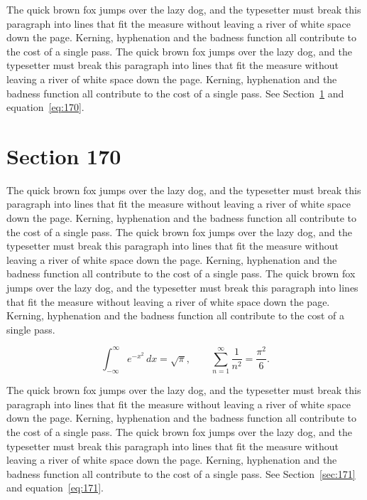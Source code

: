 \documentclass{article}
\begin{document}
The quick brown fox jumps over the lazy dog, and the typesetter must break this paragraph into lines that fit the measure without leaving a river of white space down the page. Kerning, hyphenation and the badness function all contribute to the cost of a single pass. The quick brown fox jumps over the lazy dog, and the typesetter must break this paragraph into lines that fit the measure without leaving a river of white space down the page. Kerning, hyphenation and the badness function all contribute to the cost of a single pass. 
See Section~\ref{sec:170} and equation~\eqref{eq:170}.
\section{Section 170}
\label{sec:170}
The quick brown fox jumps over the lazy dog, and the typesetter must break this paragraph into lines that fit the measure without leaving a river of white space down the page. Kerning, hyphenation and the badness function all contribute to the cost of a single pass. The quick brown fox jumps over the lazy dog, and the typesetter must break this paragraph into lines that fit the measure without leaving a river of white space down the page. Kerning, hyphenation and the badness function all contribute to the cost of a single pass. The quick brown fox jumps over the lazy dog, and the typesetter must break this paragraph into lines that fit the measure without leaving a river of white space down the page. Kerning, hyphenation and the badness function all contribute to the cost of a single pass. 

\begin{equation}\label{eq:170}
\int_{-\infty}^{\infty} e^{-x^{2}}\,dx = \sqrt{\pi}, \qquad
\sum_{n=1}^{\infty} \frac{1}{n^{2}} = \frac{\pi^{2}}{6}.
\end{equation}

The quick brown fox jumps over the lazy dog, and the typesetter must break this paragraph into lines that fit the measure without leaving a river of white space down the page. Kerning, hyphenation and the badness function all contribute to the cost of a single pass. The quick brown fox jumps over the lazy dog, and the typesetter must break this paragraph into lines that fit the measure without leaving a river of white space down the page. Kerning, hyphenation and the badness function all contribute to the cost of a single pass. 
See Section~\ref{sec:171} and equation~\eqref{eq:171}.
\end{document}
